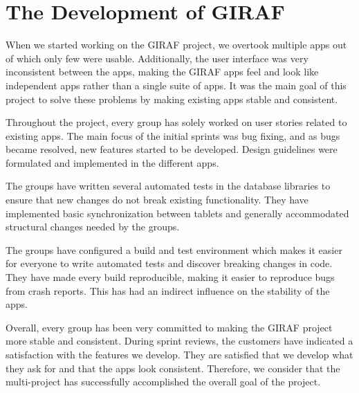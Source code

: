 \section{The Development of GIRAF}\label{conc:multi_project_eval}
When we started working on the GIRAF project, we overtook multiple apps out of which only few were usable. Additionally, the user interface was very inconsistent between the apps, making the GIRAF apps feel and look like independent apps rather than a single suite of apps. It was the main goal of this project to solve these problems by making existing apps stable and consistent.

Throughout the project, every \gui{} group has solely worked on user stories related to existing apps. The main focus of the initial sprints was bug fixing, and as bugs became resolved, new features started to be developed. Design guidelines were formulated and implemented in the different apps.

The \db{} groups have written several automated tests in the database libraries to ensure that new changes do not break existing functionality. They have implemented basic synchronization between tablets and generally accommodated structural changes needed by the \gui{} groups.

The \bd{} groups have configured a build and test environment which makes it easier for everyone to write automated tests and discover breaking changes in code. They have made every build reproducible, making it easier to reproduce bugs from crash reports. This has had an indirect influence on the stability of the apps.

Overall, every group has been very committed to making the GIRAF project more stable and consistent. During sprint reviews, the customers have indicated a satisfaction with the features we develop. They are satisfied that we develop what they ask for and that the apps look consistent. Therefore, we consider that the multi-project has successfully accomplished the overall goal of the project.
